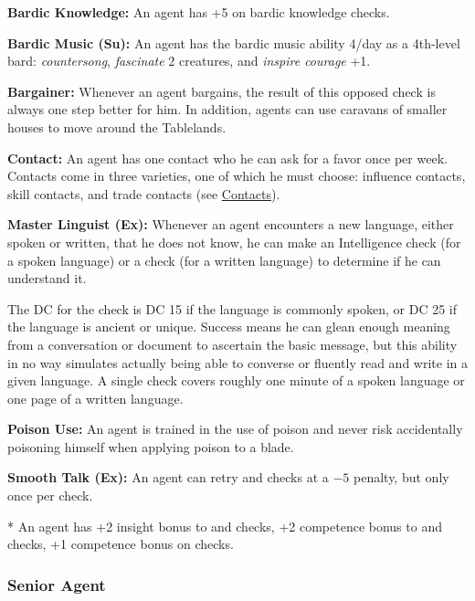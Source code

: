 \textbf{Bardic Knowledge:} An agent has +5 on bardic knowledge checks.

\textbf{Bardic Music (Su):} An agent has the bardic music ability 4/day as a 4th-level bard: \emph{countersong}, \emph{fascinate} 2 creatures, and \emph{inspire courage} +1.

\textbf{Bargainer:} Whenever an agent bargains, the result of this  opposed check is always one step better for him. In addition, agents can use caravans of smaller houses to move around the Tablelands.

\textbf{Contact:} An agent has one contact who he can ask for a favor once per week. Contacts come in three varieties, one of which he must choose: influence contacts, skill contacts, and trade contacts (see \hyperref[sec:contacts]{Contacts}).

\textbf{Master Linguist (Ex):} Whenever an agent encounters a new language, either spoken or written, that he does not know, he can make an Intelligence check (for a spoken language) or a  check (for a written language) to determine if he can understand it.

The DC for the check is DC 15 if the language is commonly spoken, or DC 25 if the language is ancient or unique. Success means he can glean enough meaning from a conversation or document to ascertain the basic message, but this ability in no way simulates actually being able to converse or fluently read and write in a given language. A single check covers roughly one minute of a spoken language or one page of a written language.

\textbf{Poison Use:} An agent is trained in the use of poison and never risk accidentally poisoning himself when applying poison to a blade.

\textbf{Smooth Talk (Ex):} An agent can retry  and  checks at a $-5$ penalty, but only once per check.

* An agent has +2 insight bonus to  and  checks, +2 competence bonus to  and  checks, +1 competence bonus on  checks.

\subsubsection{Senior Agent}


